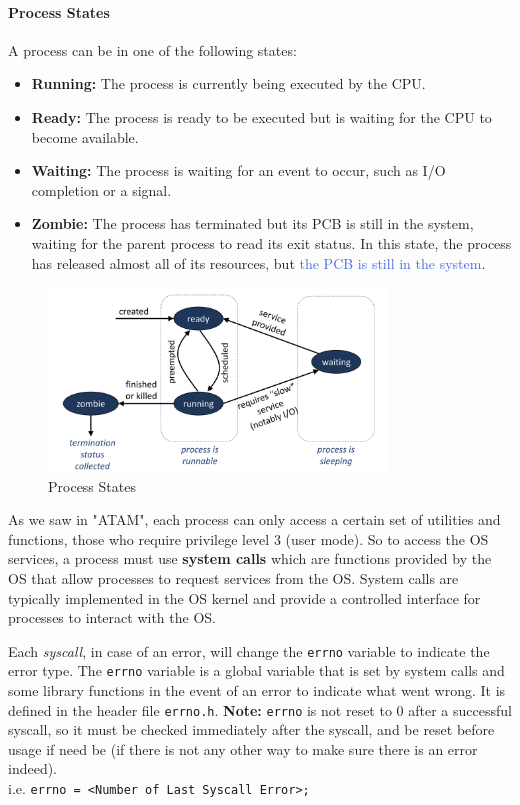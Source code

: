 \documentclass[openany,12pt]{book}
\newcommand{\code}[1]{\texttt{#1}}
\newcommand{\blue}[1]{\textcolor{RoyalBlue}{#1}}
\begin{document}
\paragraph{Process States}
A process can be in one of the following states:
\begin{itemize}
  \item \textbf{Running:} The process is currently being executed by the CPU.
  \item \textbf{Ready:} The process is ready to be executed but is waiting for the CPU to become available.
  \item \textbf{Waiting:} The process is waiting for an event to occur, such as I/O completion or a signal.
  \item \textbf{Zombie:} The process has terminated but its PCB is still in the system, waiting for the parent process to read its exit status. In this state, the process has released almost all of its resources, but \blue{the PCB is still in the system}.
\end{itemize}



\begin{figure}
  \centering
  \includegraphics[width=0.8\textwidth]{../Assets/process_states.png}
  \caption{Process States}
  \label{fig:process_states}
\end{figure}


As we saw in "ATAM", each process can only access a certain set of utilities and functions, those who require privilege level 3 (user mode). So to access the OS services, a process must use \textbf{system calls} which are functions provided by the OS that allow processes to request services from the OS. System calls are typically implemented in the OS kernel and provide a controlled interface for processes to interact with the OS.

\vspace{1em}

Each \textit{syscall}, in case of an error, will change the \texttt{errno} variable to indicate the error type. The \texttt{errno} variable is a global variable that is set by system calls and some library functions in the event of an error to indicate what went wrong. It is defined in the header file \texttt{errno.h}. {\color{blue}\textbf{Note:} \texttt{errno} is not reset to 0 after a successful syscall, so it must be checked immediately after the syscall, and be reset before usage if need be} (if there is not any other way to make sure there is an error indeed).\\
i.e. \code{errno = <Number of Last Syscall Error>;}
\end{document}

